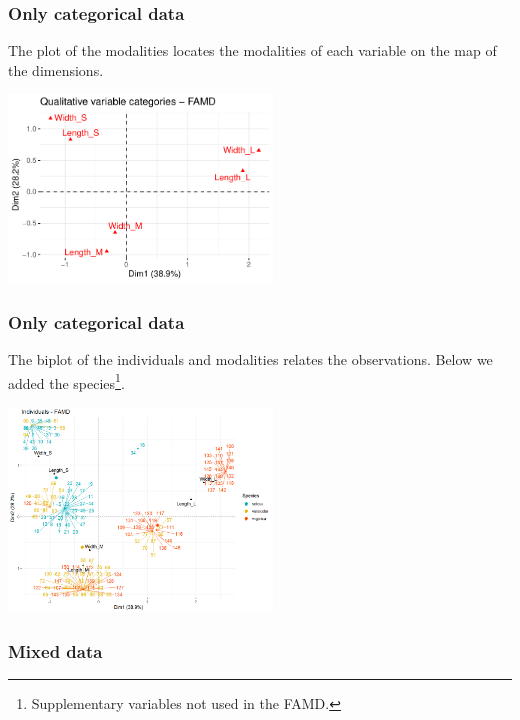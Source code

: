 \begin{frame}
\frametitle{Only categorical data}
The plot of the modalities locates the modalities of each variable on the map of the dimensions.
\begin{center}
\includegraphics[width=7cm]{../../Graphs/FAMD_quali.pdf}
\end{center}
\end{frame}
\begin{frame}
\frametitle{Only categorical data}
The biplot of the individuals and modalities relates the observations. Below we added the species\footnote{Supplementary variables not used in the FAMD.}.
\begin{center}
\includegraphics[width=7cm]{../../Graphs/FAMD_biplot_species.png}
\end{center}
\end{frame}
\begin{frame}
\frametitle{Mixed data}

\end{frame}

